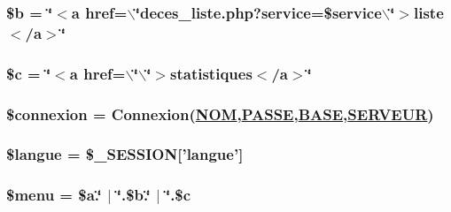 \hypertarget{deces__sup_8php_a7}{
\subsubsection[\$b]{\setlength{\rightskip}{0pt plus 5cm}\$b = \char`\"{}$<$a href=$\backslash$\char`\"{}deces\_\-liste.php?service=\$service$\backslash$\char`\"{}$>$liste$<$/a$>$\char`\"{}}}
\label{deces__sup_8php_a7}


\hypertarget{deces__sup_8php_a8}{
\subsubsection[\$c]{\setlength{\rightskip}{0pt plus 5cm}\$c = \char`\"{}$<$a href=$\backslash$\char`\"{}$\backslash$\char`\"{}$>$statistiques$<$/a$>$\char`\"{}}}
\label{deces__sup_8php_a8}


\hypertarget{deces__sup_8php_a2}{
\subsubsection[\$connexion]{\setlength{\rightskip}{0pt plus 5cm}\$connexion = Connexion(\hyperlink{pma__connect_8php_a0}{NOM},\hyperlink{pma__connect_8php_a1}{PASSE},\hyperlink{pma__connect_8php_a3}{BASE},\hyperlink{pma__connect_8php_a2}{SERVEUR})}}
\label{deces__sup_8php_a2}


\hypertarget{deces__sup_8php_a0}{
\subsubsection[\$langue]{\setlength{\rightskip}{0pt plus 5cm}\$langue = \$\_\-SESSION\mbox{[}'langue'\mbox{]}}}
\label{deces__sup_8php_a0}


\hypertarget{deces__sup_8php_a9}{
\subsubsection[\$menu]{\setlength{\rightskip}{0pt plus 5cm}\$menu = \$a.\char`\"{} $|$ \char`\"{}.\$b.\char`\"{} $|$ \char`\"{}.\$c}}
\label{deces__sup_8php_a9}


